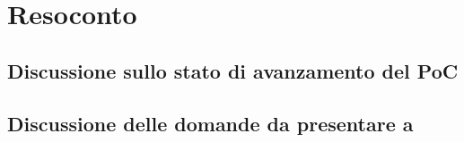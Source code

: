 \section{Resoconto}

\subsection{Discussione sullo stato di avanzamento del PoC}

\subsection{Discussione delle domande da presentare a \Proponente}